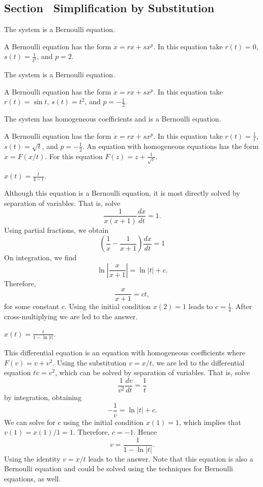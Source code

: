 \subsection*{Section~\protect{\ref{sec:SBS}} Simplification by Substitution}

 \ans The system is a Bernoulli equation.

\soln A Bernoulli equation has the form $\dot{x}=rx+sx^p$.  In this equation
take $r(t)=0$, $s(t)= \frac{1}{t^3}$, and $p=2$.

 \ans The system is a Bernoulli equation.

\soln A Bernoulli equation has the form $\dot{x}=rx+sx^p$.  In this equation
take $r(t)=\sin t$, $s(t)=t^2$, and $p=-\frac{1}{2}$.

 \ans The system has homogeneous coefficients and is a
Bernoulli equation.

\soln A Bernoulli equation has the form $\dot{x}=rx+sx^p$.  In this equation
take $r(t)=\frac{1}{t}$, $s(t)=\sqrt{t}$, and $p=-\frac{1}{2}$.  An equation
with homogeneous equations has the form $\dot{x}=F(x/t)$.  For this equation
$F(z) = z + \frac{1}{\sqrt{z}}$.

 \ans $x(t) = \frac{t}{4-t}$.

\soln  Although this equation is a Bernoulli equation, it is most directly
solved by separation of variables.  That is, solve
\[
\frac{1}{x(x+1)}\frac{dx}{dt} = 1.
\]
Using partial fractions, we obtain
\[
\left(\frac{1}{x}-\frac{1}{x+1}\right)\frac{dx}{dt} = 1
\]
On integration, we find
\[
\ln\left|\frac{x}{x+1}\right| = \ln|t| + c.
\]
Therefore,
\[
\frac{x}{x+1} = ct,
\]
for some constant $c$.  Using the initial condition $x(2)=1$ leads to
$c=\frac{1}{4}$.  After cross-multiplying we are led to the answer.

 \ans $x(t) = \frac{t}{1-\ln|t|}$.

\soln  This differential equation is an equation with homogeneous
coefficients where $F(v) = v + v^2$.  Using the substitution $v=x/t$, we
are led to the differential equation $t\dot{v}=v^2$, which can be solved
by separation of variables.  That is, solve
\[
 \frac{1}{v^2} \frac{dv}{dt} = \frac{1}{t}
\]
by integration, obtaining
\[
-\frac{1}{v} = \ln|t| + c.
\]
We can solve for $c$ using the initial condition $x(1)=1$, which implies
that $v(1)=x(1)/1=1$.  Therefore, $c=-1$.  Hence
\[
v = \frac{1}{1-\ln|t|}.
\]
Using the identity $v=x/t$ leads to the answer.   Note that this equation is
also a Bernoulli equation and could be solved using the techniques for
Bernoulli equations, as well.



